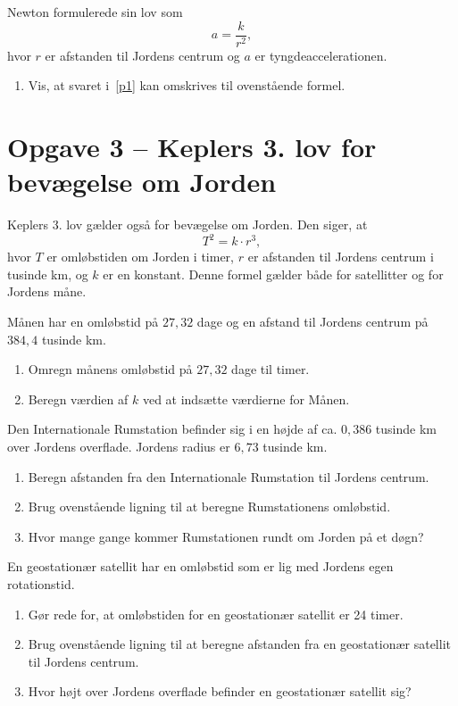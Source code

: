 \documentclass[12pt,oneside,a4paper]{article}
\theoremstyle{plain}
\begin{document}
Newton formulerede sin lov som
$$
a = \frac{k}{r^2},
$$
hvor $r$ er afstanden til Jordens centrum og $a$ er tyngdeaccelerationen.

\begin{enumerate}[label=(\alph*) ,resume]
    \item Vis, at svaret i~\ref{p1} kan omskrives til ovenstående formel.
\end{enumerate}


\section*{Opgave 3 -- Keplers 3. lov for bevægelse om Jorden}
Keplers 3. lov gælder også for bevægelse om Jorden. Den siger, at
$$
T^2 = k\cdot r^3,
$$
hvor $T$ er omløbstiden om Jorden i timer, $r$ er afstanden til Jordens centrum
i tusinde km, og $k$ er en konstant. Denne formel gælder både for satellitter
og for Jordens måne.

Månen har en omløbstid på $27,32$ dage og en afstand til Jordens centrum på
$384,4$ tusinde km.
\begin{enumerate}[label=(\alph*)]
    \item Omregn månens omløbstid på $27,32$ dage til timer.
    \item Beregn værdien af $k$ ved at indsætte værdierne for Månen.
\end{enumerate}



Den Internationale Rumstation befinder sig i en højde af ca. $0,386$ tusinde km over
Jordens overflade. Jordens radius er $6,73$ tusinde km.
\begin{enumerate}[label=(\alph*), resume]
    \item Beregn afstanden fra den Internationale Rumstation til Jordens
        centrum.
    \item Brug ovenstående ligning til at beregne Rumstationens omløbstid.
    \item Hvor mange gange kommer Rumstationen rundt om Jorden på et døgn?
\end{enumerate}


En geostationær satellit har en omløbstid som er lig med Jordens egen
rotationstid.
\begin{enumerate}[label=(\alph*), resume]
    \item Gør rede for, at omløbstiden for en geostationær satellit er 24 timer.
    \item Brug ovenstående ligning til at beregne afstanden fra en geostationær
        satellit til Jordens centrum.
    \item Hvor højt over Jordens overflade befinder en geostationær satellit sig?
\end{enumerate}
\end{document}
